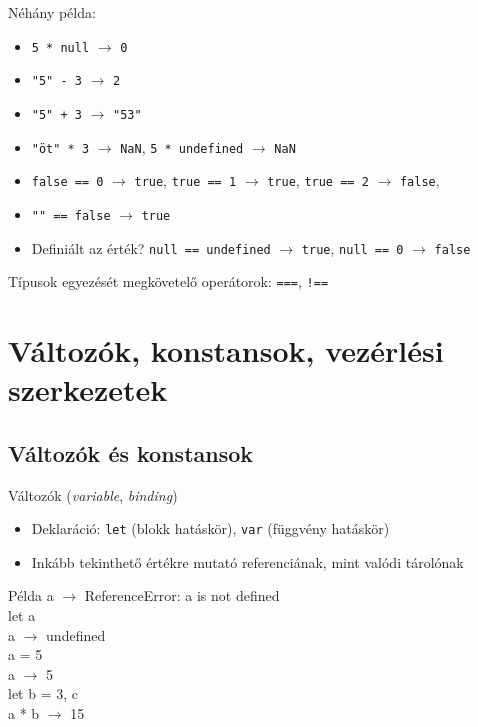 \documentclass[usenames,dvipsnames,aspectratio=169]{beamer}
\begin{document}
\begin{frame}
    Néhány példa:
    \begin{itemize}
        \item \texttt{5 * null} $\to$ \texttt{0}
        \item \texttt{"5" - 3} $\to$ \texttt{2}
        \item \texttt{"5" + 3} $\to$ \texttt{"53"}
        \item \texttt{"öt" * 3} $\to$ \texttt{NaN}, \texttt{5 * undefined} $\to$ \texttt{NaN}
        \item \texttt{false == 0} $\to$ \texttt{true}, \texttt{true == 1} $\to$ \texttt{true}, \texttt{true == 2} $\to$ \texttt{false}, \item \texttt{"" == false} $\to$ \texttt{true}
        \item Definiált az érték? \texttt{null == undefined} $\to$ \texttt{true}, \texttt{null == 0} $\to$ \texttt{false}
    \end{itemize}
    \vfill
    Típusok egyezését megkövetelő operátorok: \texttt{===}, \texttt{!==}
\end{frame}

\section{Változók, konstansok, vezérlési szerkezetek}

\subsection{Változók és konstansok}

\begin{frame}
    Változók (\emph{variable}, \emph{binding})
    \begin{itemize}
        \item Deklaráció: \texttt{let} (blokk hatáskör), \texttt{var} (függvény hatáskör)
        \item Inkább tekinthető értékre mutató referenciának, mint valódi tárolónak
    \end{itemize}
    \begin{exampleblock}{Példa}
        a $\to$ ReferenceError: a is not defined\\
        let a\\
        a $\to$ undefined\\
        a = 5\\
        a $\to$ 5\\
        let b = 3, c\\
        a * b $\to$ 15\\
    \end{exampleblock}
\end{frame}
\end{document}
